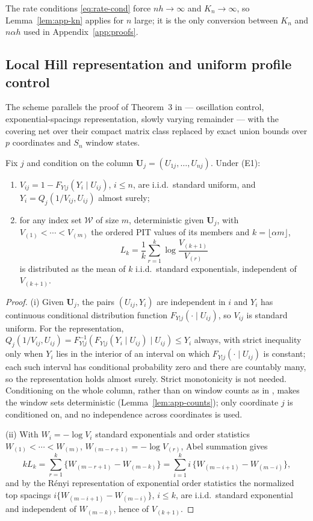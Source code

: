The rate conditions \eqref{eq:rate-cond} force $nh\to\infty$ and
$K_n\to\infty$, so Lemma~\ref{lem:app-kn} applies for $n$ large; it is
the only conversion between $K_n$ and $n\alpha h$ used in
Appendix~\ref{app:proofs}.

\subsection{Local Hill representation and uniform profile control}
\label{app:hill}

The scheme parallels the proof of Theorem~3 in
\citet{gardesPodgorny2025} --- oscillation control,
exponential-spacings representation, slowly varying remainder --- with
the covering net over their compact matrix class replaced by exact union
bounds over $p$ coordinates and $S_n$ window states.

\begin{lemma}\label{lem:app-pit}
Fix $j$ and condition on the column $\bm U_j=(U_{1j},\ldots,U_{nj})$.
Under (E1):
\begin{enumerate}
\item $V_{ij}=1-F_{Y|j}(Y_i\mid U_{ij})$, $i\le n$, are i.i.d.\ standard
uniform, and $Y_i=Q_j(1/V_{ij},U_{ij})$ almost surely;
\item for any index set $\mathcal W$ of size $m$, deterministic given
$\bm U_j$, with $V_{(1)}<\cdots<V_{(m)}$ the ordered PIT values of its
members and $k=\lfloor\alpha m\rfloor$,
\[
 L_k=\frac1k\sum_{r=1}^k\log\frac{V_{(k+1)}}{V_{(r)}}
\]
is distributed as the mean of $k$ i.i.d.\ standard exponentials,
independent of $V_{(k+1)}$.
\end{enumerate}
\end{lemma}

\begin{proof}
(i) Given $\bm U_j$, the pairs $(U_{ij},Y_i)$ are independent in $i$ and
$Y_i$ has continuous conditional distribution function
$F_{Y|j}(\cdot\mid U_{ij})$, so $V_{ij}$ is standard uniform.  For the
representation, $Q_j(1/V_{ij},U_{ij})=F_{Y|j}^{-1}(F_{Y|j}(Y_i\mid
U_{ij})\mid U_{ij})\le Y_i$ always, with strict inequality only when
$Y_i$ lies in the interior of an interval on which
$F_{Y|j}(\cdot\mid U_{ij})$ is constant; each such interval has
conditional probability zero and there are countably many, so the
representation holds almost surely.  Strict monotonicity is not needed.
Conditioning on the whole column, rather than on window counts as in
\citet[Appendix, Lemma~4]{gardesPodgorny2025}, makes the window sets
deterministic (Lemma~\ref{lem:app-counts}); only coordinate $j$ is
conditioned on, and no independence across coordinates is used.

(ii) With $W_i=-\log V_i$ standard exponentials and order statistics
$W_{(1)}<\cdots<W_{(m)}$, $W_{(m-r+1)}=-\log V_{(r)}$, Abel summation
gives
\[
 kL_k=\sum_{r=1}^k\{W_{(m-r+1)}-W_{(m-k)}\}
 =\sum_{i=1}^k i\,\{W_{(m-i+1)}-W_{(m-i)}\},
\]
and by the R\'enyi representation of exponential order statistics
\citep{renyi1953} the normalized top spacings
$i\{W_{(m-i+1)}-W_{(m-i)}\}$, $i\le k$, are i.i.d.\ standard exponential
and independent of $W_{(m-k)}$, hence of $V_{(k+1)}$.
\end{proof}

